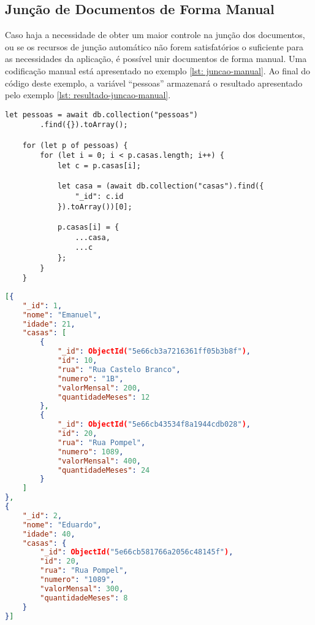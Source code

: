 \subsection{Junção de Documentos de Forma Manual}

Caso haja a necessidade de obter um maior controle na junção dos documentos, ou se os recursos de junção automático não forem satisfatórios o suficiente para as necessidades da aplicação, é possível unir documentos de forma manual. Uma codificação manual está apresentado no exemplo \ref{lst: juncao-manual}. Ao final do código deste exemplo, a variável ``pessoas'' armazenará o resultado apresentado pelo exemplo \ref{lst: resultado-juncao-manual}.


\begin{lstlisting}[style=ES6, caption={Junção Manual dos Documentos de Pessoa com Casa\label{lst: juncao-manual}}]
    let pessoas = await db.collection("pessoas")
        .find({}).toArray();
    
    for (let p of pessoas) {
        for (let i = 0; i < p.casas.length; i++) {
            let c = p.casas[i];
    
            let casa = (await db.collection("casas").find({
                "_id": c.id
            }).toArray())[0];
    
            p.casas[i] = {
                ...casa,
                ...c
            };
        }
    }
\end{lstlisting}


\begin{lstlisting}[language=json, caption={Junção de Documentos de Forma Manual\label{lst: resultado-juncao-manual}}]
[{
    "_id": 1,
    "nome": "Emanuel",
    "idade": 21,
    "casas": [
        {
            "_id": ObjectId("5e66cb3a7216361ff05b3b8f"),
            "id": 10,
            "rua": "Rua Castelo Branco",
            "numero": "1B",
            "valorMensal": 200,
            "quantidadeMeses": 12
        },
        {
            "_id": ObjectId("5e66cb43534f8a1944cdb028"),
            "id": 20,
            "rua": "Rua Pompel",
            "numero": 1089,
            "valorMensal": 400,
            "quantidadeMeses": 24
        }
    ]
},
{
    "_id": 2,
    "nome": "Eduardo",
    "idade": 40,
    "casas": {
        "_id": ObjectId("5e66cb581766a2056c48145f"),
        "id": 20,
        "rua": "Rua Pompel",
        "numero": "1089",
        "valorMensal": 300,
        "quantidadeMeses": 8
    }
}]
\end{lstlisting}

